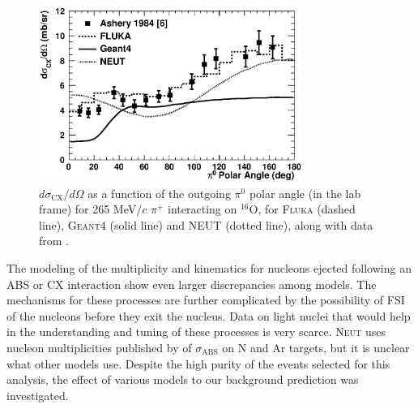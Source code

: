 \begin{figure}[h]
 \includegraphics[width=86mm]{figures/dsigma_cx_o16_data_and_models.eps}
 \caption{$d\sigma_{\mathrm{CX}}/d\Omega$ as a function of the outgoing $\pi^0$ polar angle (in the lab frame) for 265 MeV$/c$ $\pi^{+}$ interacting on $^{16}$O, for \textsc{Fluka} (dashed line), \textsc{Geant4} (solid line) and \textsc{NEUT} (dotted line), along with data from \cite{Ashery2}.}
 \label{fig:pi0kinem}
\end{figure}

The modeling of the multiplicity and kinematics for nucleons ejected following an ABS or CX interaction show even larger discrepancies among models. The mechanisms for these processes are further complicated by the possibility of FSI of the nucleons before they exit the nucleus. Data on light nuclei that would help in the understanding and tuning of these processes is very scarce. \textsc{Neut} uses nucleon multiplicities published by \cite{Rowntree} of $\sigma_{\mathrm{ABS}}$ on N and Ar targets, but it is unclear what other models use. Despite the high purity of the events selected for this analysis, the effect of various models to our background prediction was investigated.

